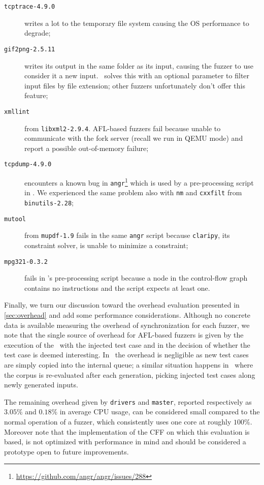 \begin{description}
    \item[\texttt{tcptrace-4.9.0}] writes a lot to the temporary file
        system causing the \ac{OS} performance to degrade;
    \item[\texttt{gif2png-2.5.11}] writes its output in the same folder as its
        input, causing the fuzzer to use consider it a new input. \vuzzer\
        solves this with an optional parameter to filter input files by file
        extension; other fuzzers unfortunately don't offer this feature;
    \item[\texttt{xmllint}] from \texttt{libxml2-2.9.4}. AFL-based fuzzers fail
        because unable to communicate with the fork server (recall we run in
        QEMU mode) and report a possible out-of-memory failure;
    \item[\texttt{tcpdump-4.9.0}] encounters a known bug in
        \texttt{angr}\footnote{\url{https://github.com/angr/angr/issues/288}}
        which is used by a pre-processing script in \vuzzer. We experienced the
        same problem also with \texttt{nm} and \texttt{cxxfilt} from
        \texttt{binutils-2.28};
    \item[\texttt{mutool}] from \texttt{mupdf-1.9} fails in the same
        \texttt{angr} script because \texttt{claripy}, its constraint solver, is
        unable to minimize a constraint;
    \item[\texttt{mpg321-0.3.2}] fails in \vuzzer's pre-processing script
        because a node in the control-flow graph contains no instructions and
        the script expects at least one.
\end{description}

Finally, we turn our discussion toward the overhead evaluation presented in
\autoref{sec:overhead} and add some performance considerations. Although no
concrete data is available measuring the overhead of synchronization for each
fuzzer, we note that the single source of overhead for AFL-based fuzzers is
given by the execution of the \sut\ with the injected test case and in the
decision of whether the test case is deemed interesting. In \honggfuzz\ the
overhead is negligible as new test cases are simply copied into the internal
queue; a similar situation happens in \vuzzer\ where the corpus is re-evaluated
after each generation, picking injected test cases along newly generated inputs.

The remaining overhead given by \texttt{drivers} and \texttt{master}, reported
respectively as $3.05\%$ and $0.18\%$ in average CPU usage, can be considered
small compared to the normal operation of a fuzzer, which consistently uses one
core at roughly $100\%$. Moreover note that the implementation of the \ac{CFF}
on which this evaluation is based, is not optimized with performance in mind and
should be considered a prototype open to future improvements.


